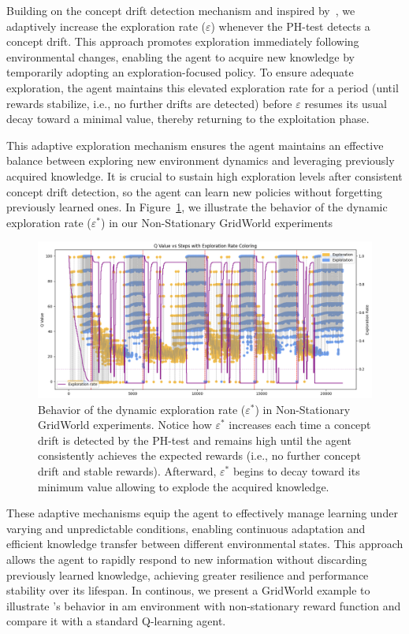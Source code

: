 Building on the concept drift detection mechanism and inspired by~\citet{mignon2017adaptive}, we adaptively increase the exploration rate ($\varepsilon$) whenever the PH-test detects a concept drift. This approach promotes exploration immediately following environmental changes, enabling the agent to acquire new knowledge by temporarily adopting an exploration-focused policy. To ensure adequate exploration, the agent maintains this elevated exploration rate for a period (until rewards stabilize, i.e., no further drifts are detected) before $\varepsilon$ resumes its usual decay toward a minimal value, thereby returning to the exploitation phase.

This adaptive exploration mechanism ensures the agent maintains an effective balance between exploring new environment dynamics and leveraging previously acquired knowledge. It is crucial to sustain high exploration levels after consistent concept drift detection, so the agent can learn new policies without forgetting previously learned ones. In Figure~\ref{fig:epsilon}, we illustrate the behavior of the dynamic exploration rate ($\varepsilon^*$) in our Non-Stationary GridWorld experiments

\begin{figure}
    \centering
    \includegraphics[width=\textwidth]{figures/epsilon.png}
    \caption{Behavior of the dynamic exploration rate ($\varepsilon^*$) in Non-Stationary GridWorld experiments. Notice how $\varepsilon^*$ increases each time a concept drift is detected by the PH-test and remains high until the agent consistently achieves the expected rewards (i.e., no further concept drift and stable rewards). Afterward, $\varepsilon^*$ begins to decay toward its minimum value allowing to explode the acquired knowledge.}
    \label{fig:epsilon}
\end{figure}

These adaptive mechanisms equip the agent to effectively manage learning under varying and unpredictable conditions, enabling continuous adaptation and efficient knowledge transfer between different environmental states. This approach allows the agent to rapidly respond to new information without discarding previously learned knowledge, achieving greater resilience and performance stability over its lifespan. In continous, we present a GridWorld example to illustrate \adaptiverl's behavior in am environment with non-stationary reward function and compare it with a standard Q-learning agent.

